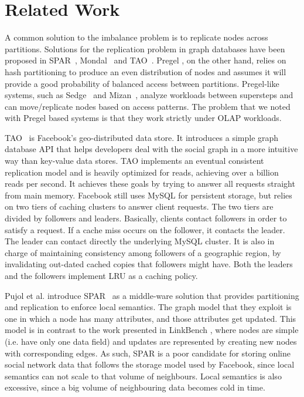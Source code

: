 \section{Related Work}

A common solution to the imbalance problem is to replicate nodes across partitions.
Solutions for the replication problem in graph databases have been proposed in
SPAR~\cite{Pujol12}, Mondal~\cite{Mondal12} and TAO~\cite{Bronson13}. Pregel
\cite{Malewicz10}, on the other hand, relies on hash partitioning to produce an even
distribution of nodes and assumes it will provide a good probability of balanced access
between partitions. Pregel-like systems, such as Sedge~\cite{Yang12} and
Mizan~\cite{Khayyat13}, analyze workloads between supersteps and can
move/replicate nodes based on access patterns. The problem that we noted with
Pregel based systems is that they work strictly under OLAP workloads.

TAO~\cite{Bronson13} is Facebook's geo-distributed data store. It introduces a
simple graph database API that helps developers deal with the social graph in a
more intuitive way than key-value data stores. TAO implements an eventual
consistent replication model and is heavily optimized for reads, achieving over a
billion reads per second. It achieves these goals by trying to answer all requests
straight from main memory. Facebook still uses MySQL for persistent storage, but
relies on two tiers of caching clusters to answer client requests. The two tiers are
divided by followers and leaders. Basically, clients contact followers in order to
satisfy a request. If a cache miss occurs on the follower, it contacts the leader.
The leader can contact directly the underlying MySQL cluster. It is also in charge
of maintaining consistency among followers of a geographic region, by invalidating
out-dated cached copies that followers might have. Both the leaders and the
followers implement LRU as a caching policy.

Pujol et al. introduce SPAR~\cite{Pujol12} as a middle-ware solution that
provides partitioning and replication to enforce local semantics. The graph
model that they exploit is one in which a node has many attributes, and those
attributes get updated. This model is in contrast to the work presented in
LinkBench \cite{Armstrong13}, where nodes are simple (i.e. have only one data
field) and updates are represented by creating new nodes with corresponding
edges. As such, SPAR is a poor candidate for storing online social network data
that follows the storage model used by Facebook, since local semantics can not
scale to that volume of neighbours. Local semantics is also excessive, since a
big volume of neighbouring data becomes cold in time.

